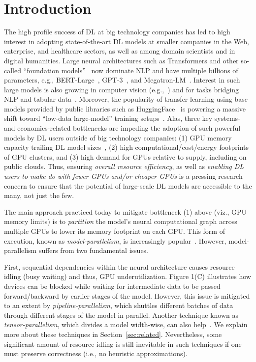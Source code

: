 \documentclass{article}
\begin{document}
\section{Introduction}
\label{sec:introduction}
The high profile success of DL at big technology companies has led to high interest in adopting state-of-the-art DL models at smaller companies in the Web, enterprise, and healthcare sectors, as well as among domain scientists and in digital humanities. Large neural architectures such as Transformers and other so-called ``foundation models''~\cite{foundationmodels} now dominate NLP and have multiple billions of parameters, e.g., BERT-Large~\cite{devlinBert}, GPT-3~\cite{brown2020language}, and Megatron-LM~\cite{shoeybi2019megatron}. Interest in such large models is also growing in computer vision (e.g.,~\cite{vit}) and for tasks bridging NLP and tabular data~\cite{tabert}. Moreover, the popularity of transfer learning using base models provided by public libraries such as HuggingFace~\cite{huggingface} is powering a massive shift toward ``low-data large-model'' training setups~\cite{foundationmodels}. 
Alas, three key systems- and economics-related bottlenecks are impeding the adoption of such powerful models by DL users outside of big technology companies: (1) GPU memory capacity trailing DL model sizes~\cite{sohonilowmem}, (2) high computational/cost/energy footprints of GPU clusters, and (3) high demand for GPUs relative to supply, including on public clouds. Thus, ensuring \textit{overall resource efficiency}, as well as \textit{enabling DL users to make do with fewer GPUs and/or cheaper GPUs} is a pressing research concern to ensure that the potential of large-scale DL models are accessible to the many, not just the few.

The main approach practiced today to mitigate bottleneck (1) above (viz., GPU memory limits) is to \textit{partition} the model's neural computational graph across multiple GPUs to lower its memory footprint on each GPU. This form of execution, known as \textit{model-parallelism}, is increasingly popular~\cite{modelparallelism}. However, model-parallelism suffers from two fundamental issues.

First, sequential dependencies within the neural architecture causes resource idling (busy waiting) and thus, GPU underutilization. Figure 1(C) illustrates how devices can be blocked while waiting for intermediate data to be passed forward/backward by earlier stages of the model. However, this issue is mitigated to an extent by \textit{pipeline-parallelism}, which shuttles different batches of data through different stages of the model in parallel. 
Another technique known as \textit{tensor-parallelism}, which divides a model width-wise, can also help~\cite{flexflow}.
We explain more about these techniques in Section~\ref{sec:related}. Nevertheless, some significant amount of resource idling is still inevitable in such techniques if one must preserve correctness (i.e., no heuristic approximations).
\end{document}
